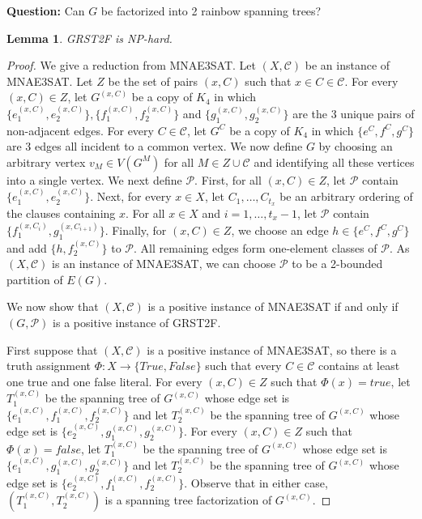 \documentclass{article}
\newtheorem{Lemma}[Statement]{Lemma}
\begin{document}
\noindent\textbf{Question:} Can $G$ be factorized into 2 rainbow spanning trees?
\medskip
\begin{Lemma}\label{general}
GRST2F is NP-hard.
\end{Lemma}
\begin{proof}
We give a reduction from MNAE3SAT. Let $(X,\mathcal{C})$ be an instance of MNAE3SAT. Let $Z$ be the set of pairs $(x,C)$ such that $x \in C \in \mathcal{C}$. For every $(x,C) \in Z $, let $G^{(x,C)}$ be a copy of $K_4$ in which $\{e_1^{(x,C)},e_2^{(x,C)}\},\{f_1^{(x,C)},f_2^{(x,C)}\}$ and $\{g_1^{(x,C)},g_2^{(x,C)}\}$ are the 3 unique pairs of non-adjacent edges.  For every $C \in \mathcal{C} $, let $G^C$ be a copy of $K_4$ in which $\{e^C,f^C,g^C\}$ are 3 edges all incident to a common vertex. We now define $G$ by choosing an arbitrary vertex $v_M \in V(G^M)$ for all $M \in Z \cup \mathcal{C}$ and identifying all these vertices into a single vertex. We next define $\mathcal{P}$. First, for all $(x,C) \in Z$, let $\mathcal{P}$ contain $\{e_1^{(x,C)},e_2^{(x,C)}\}$. Next, for every $x \in X$, let $C_1,\ldots,C_{t_x}$ be an arbitrary ordering of the clauses containing $x$. For all $x \in X$ and $i=1,\ldots,{t_x}-1$, let $\mathcal{P}$ contain $\{f_1^{(x,C_i)},g_1^{(x,C_{i+1})}\}$. Finally, for $(x,C)\in Z$, we choose an edge $h \in \{e^C,f^C,g^C\}$ and add $\{h,f_2^{(x,C)}\}$ to $\mathcal{P}$. All remaining edges form one-element classes of $\mathcal{P}$. As $(X,\mathcal{C})$ is an instance of MNAE3SAT, we can choose $\mathcal{P}$ to be a 2-bounded partition of $E(G)$.

We now show that $(X,\mathcal{C})$ is a positive instance of MNAE3SAT if and only if $(G,\mathcal{P})$ is a positive instance of GRST2F.

First suppose that $(X,\mathcal{C})$ is a positive instance of MNAE3SAT, so there is a truth assignment $\Phi:X \rightarrow \{True,False\}$ such that every $C \in \mathcal{C}$ contains at least one true and one false literal. For every $(x,C) \in Z$ such that $\Phi(x)=true$, let $T_1^{(x,C)}$ be the spanning tree of $G^{(x,C)}$ whose edge set is $\{e_1^{(x,C)},f_1^{(x,C)},f_2^{(x,C)}\}$ and  let $T_2^{(x,C)}$ be the spanning tree of $G^{(x,C)}$ whose edge set is $\{e_2^{(x,C)},g_1^{(x,C)},g_2^{(x,C)}\}$.  For every $(x,C) \in Z$ such that $\Phi(x)=false$, let $T_1^{(x,C)}$ be the spanning tree of $G^{(x,C)}$ whose edge set is $\{e_1^{(x,C)},g_1^{(x,C)},g_2^{(x,C)}\}$ and  let $T_2^{(x,C)}$ be the spanning tree of $G^{(x,C)}$ whose edge set is $\{e_2^{(x,C)},f_1^{(x,C)},f_2^{(x,C)}\}$. Observe that in either case, $(T_1^{(x,C)},T_2^{(x,C)})$ is a spanning tree factorization of $G^{(x,C)}$.


\end{proof}
\end{document}
